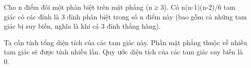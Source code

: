 Cho n điểm đôi một phân biệt trên mặt phẳng (n ≥ 3). Có n(n-1)(n-2)/6 tam giác có các đỉnh là 3 đỉnh phân biệt trong số n điểm này (bao gồm cả những tam giác bị suy biến, nghĩa là khi cả 3 đỉnh thẳng hàng).  

   Ta cần tính tổng diện tích của các tam giác này. Phần mặt phẳng thuộc về nhiều tam giác sẽ được tính nhiều lần. Quy ước diện tích của các tam giác suy biến là 0.